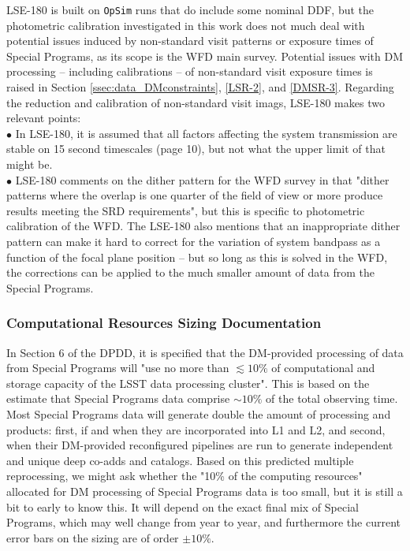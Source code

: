 \documentclass[DM,lsstdraft,toc]{lsstdoc}
\begin{document}
LSE-180 is built on {\tt OpSim} runs that do include some nominal DDF, but the photometric calibration investigated in this work does not much deal with potential issues induced by non-standard visit patterns or exposure times of Special Programs, as its scope is the WFD main survey. Potential issues with DM processing -- including calibrations -- of non-standard visit exposure times is raised in Section \ref{ssec:data_DMconstraints}, \ref{LSR-2}, and \ref{DMSR-3}. Regarding the reduction and calibration of non-standard visit imags, LSE-180 makes two relevant points: \\
$\bullet$ In LSE-180, it is assumed that all factors affecting the system transmission are stable on 15 second timescales (page 10), but not what the upper limit of that might be. \\
$\bullet$ LSE-180 comments on the dither pattern for the WFD survey in that "dither patterns where the overlap is one quarter of the field of view or more produce results meeting the SRD requirements", but this is specific to photometric calibration of the WFD. The LSE-180 also mentions that an inappropriate dither pattern can make it hard to correct for the variation of system bandpass as a function of the focal plane position -- but so long as this is solved in the WFD, the corrections can be applied to the much smaller amount of data from the Special Programs.


\subsubsection{Computational Resources Sizing Documentation}\label{sssec:dmplans_review_sizing}

In Section 6 of the DPDD, it is specified that the DM-provided processing of data from Special Programs will "use no more than $\lesssim10\%$ of computational and storage capacity of the LSST data processing cluster". This is based on the estimate that Special Programs data comprise $\sim10\%$ of the total observing time. Most Special Programs data will generate double the amount of processing and products: first, if and when they are incorporated into L1 and L2, and second, when their DM-provided reconfigured pipelines are run to generate independent and unique deep co-adds and catalogs. Based on this predicted multiple reprocessing, we might ask whether the "10\% of the computing resources" allocated for DM processing of Special Programs data is too small, but it is still a bit to early to know this. It will depend on the exact final mix of Special Programs, which may well change from year to year, and furthermore the current error bars on the sizing are of order $\pm10\%$. 
\end{document}

